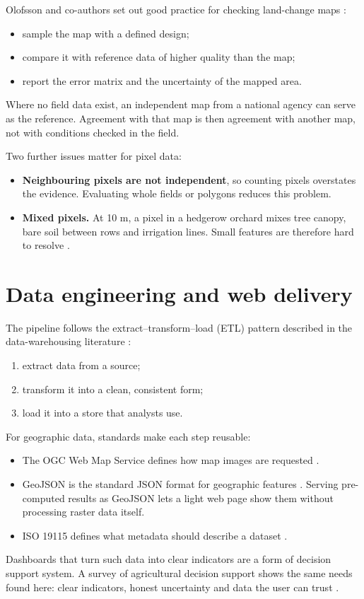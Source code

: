 Olofsson and co-authors set out good practice for checking land-change maps \cite{R263}:

\begin{itemize}
  \item sample the map with a defined design;
  \item compare it with reference data of higher quality than the map;
  \item report the error matrix and the uncertainty of the mapped area.

\end{itemize}
Where no field data exist, an independent map from a national agency can serve as the reference. Agreement with that map is then agreement with another map, not with conditions checked in the field.

Two further issues matter for pixel data:

\begin{itemize}
  \item \textbf{Neighbouring pixels are not independent}, so counting pixels overstates the evidence. Evaluating whole fields or polygons reduces this problem.
  \item \textbf{Mixed pixels.} At 10 m, a pixel in a hedgerow orchard mixes tree canopy, bare soil between rows and irrigation lines. Small features are therefore hard to resolve \cite{R201}.

\end{itemize}
\section{Data engineering and web delivery}

The pipeline follows the extract–transform–load (ETL) pattern described in the data-warehousing literature \cite{R252}:

\begin{enumerate}
  \item extract data from a source;
  \item transform it into a clean, consistent form;
  \item load it into a store that analysts use.

\end{enumerate}
For geographic data, standards make each step reusable:

\begin{itemize}
  \item The OGC Web Map Service defines how map images are requested \cite{R249}.
  \item GeoJSON is the standard JSON format for geographic features \cite{R251}. Serving pre-computed results as GeoJSON lets a light web page show them without processing raster data itself.
  \item ISO 19115 defines what metadata should describe a dataset \cite{R254}.

\end{itemize}
Dashboards that turn such data into clear indicators are a form of decision support system. A survey of agricultural decision support shows the same needs found here: clear indicators, honest uncertainty and data the user can trust \cite{R253}.

